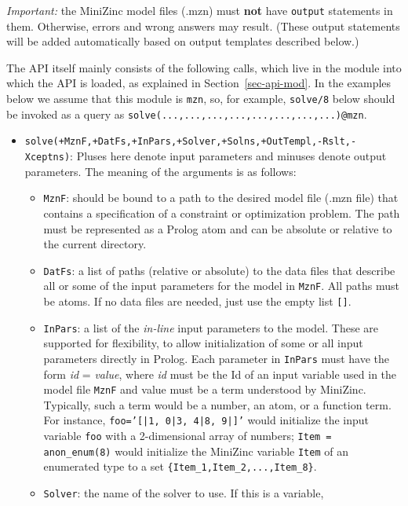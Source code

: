 \noindent
\emph{Important:} the MiniZinc model files (.mzn) must \textbf{not} have
\texttt{output} statements in them. Otherwise, errors and wrong answers
may result. (These output statements will be added automatically based on
output templates described below.)  


The API itself mainly consists of the following calls, which live in the
\FLSYSTEM module into which the API is loaded, as explained in
Section~\ref{sec-api-mod}. 
In the examples below we assume that this module is \texttt{mzn}, so, for
example, \texttt{solve/8} below should be invoked as a query as
\texttt{solve(...,...,...,...,...,...,...,...)@mzn}.   

\begin{itemize}
\item
  \texttt{solve(+MznF,+DatFs,+InPars,+Solver,+Solns,+OutTempl,-Rslt,-Xceptns)}: 
  Pluses here denote input parameters and minuses denote output parameters.
  The meaning of the arguments is as follows:
  \begin{itemize}
  \item    \texttt{MznF}: should be bound to a path to the desired 
    model file (.mzn file) that contains a specification of a constraint or
    optimization problem. The path must be represented as a Prolog atom and
    can be absolute or relative to the current directory.
  \item \texttt{DatFs}: a list of paths (relative or absolute)  
    to the data files that describe all or some of the input parameters for
    the model in \texttt{MznF}. All paths must be atoms.
    If no data files are needed, just use the empty list \texttt{[]}. 
  \item \texttt{InPars}: a list of the \emph{in-line} input parameters to
    the model.
    These are supported for flexibility, to allow initialization of some or
    all input parameters directly in Prolog.
    Each parameter in \texttt{InPars} must have the form \emph{id} =
    \emph{value}, where \emph{id} must be the Id of an input variable used in
    the model file \texttt{MznF} and value must be a term understood by MiniZinc.
    Typically, such a term would be a number, an atom, or a function term.
    For instance,  \texttt{foo='[|1, 0|3, 4|8, 9|]'} would initialize the input
    variable \texttt{foo} with a 2-dimensional array of numbers;
    \texttt{Item = anon\_enum(8)}  would initialize the MiniZinc variable
    \texttt{Item}  of an enumerated type to a set
    \texttt{\{Item\_1,Item\_2,...,Item\_8\}}.
  \item \texttt{Solver}: the name of the solver to use. If this is a variable,

\end{itemize}
\end{itemize}

